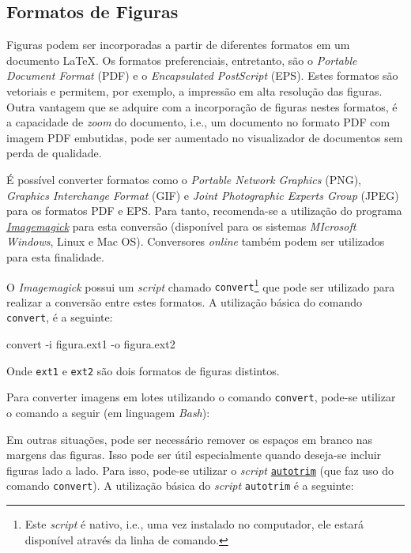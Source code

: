 \subsection*{Formatos de Figuras}
\label{sec:form_docs/figs}

Figuras podem ser incorporadas a partir de diferentes formatos em um documento \LaTeX{}. Os formatos preferenciais, entretanto, são o \textit{Portable Document Format} (PDF) e o \textit{Encapsulated PostScript} (EPS). Estes formatos são vetoriais e permitem, por exemplo, a impressão em alta resolução das figuras. Outra vantagem que se adquire com a incorporação de figuras nestes formatos, é a capacidade de \textit{zoom} do documento, i.e., um documento no formato PDF com imagem PDF embutidas, pode ser aumentado no visualizador de documentos sem perda de qualidade.

É possível converter formatos como o \textit{Portable Network Graphics} (PNG), \textit{Graphics Interchange Format} (GIF) e \textit{Joint Photographic Experts Group} (JPEG) para os formatos PDF e EPS. Para tanto, recomenda-se a utilização do programa \href{https://imagemagick.org/index.php}{\textit{Imagemagick}} para esta conversão (disponível para os sistemas \textit{MIcrosoft Windows}, Linux e Mac OS). Conversores \textit{online} também podem ser utilizados para esta finalidade.

O \textit{Imagemagick} possui um \textit{script} chamado {\tt convert}\footnote{Este \textit{script} é nativo, i.e., uma vez instalado no computador, ele estará disponível através da linha de comando.} que pode ser utilizado para realizar a conversão entre estes formatos. A utilização básica do comando {\tt convert}, é a seguinte:

\begin{meucomando}
convert -i figura.ext1 -o figura.ext2
\end{meucomando}

Onde {\tt ext1} e {\tt ext2} são dois formatos de figuras distintos.

Para converter imagens em lotes utilizando o comando {\tt convert}, pode-se utilizar o comando a seguir (em linguagem \textit{Bash}):


Em outras situações, pode ser necessário remover os espaços em branco nas margens das figuras. Isso pode ser útil especialmente quando deseja-se incluir figuras lado a lado. Para isso, pode-se utilizar o \textit{script} \href{http://www.fmwconcepts.com/imagemagick/autotrim/index.php}{{\tt autotrim}} (que faz uso do comando {\tt convert}). A utilização básica do \textit{script} {\tt autotrim} é a seguinte:

